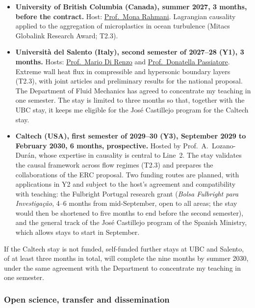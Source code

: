 \documentclass[11pt]{article}
\begin{document}
\begin{itemize}
  \item \textbf{University of British Columbia (Canada), summer 2027, 3 months, before the
  contract.} Host: \href{https://chbe.ubc.ca/mona-rahmani/}{Prof.\ Mona Rahmani}. Lagrangian
  causality applied to the aggregation of microplastics in ocean turbulence (Mitacs Globalink
  Research Award; T2.3).
  
  \item \textbf{Universit\`a del Salento (Italy), second semester of 2027--28 (Y1), 3 months.} Hosts:
  \href{https://www.unisalento.it/scheda-utente/-/people/mario.direnzo}{Prof.\ Mario Di Renzo}
  and \href{https://www.unisalento.it/scheda-utente/-/people/donatella.passiatore}{Prof.\
  Donatella Passiatore}. Extreme wall heat flux in compressible and hypersonic boundary layers (T2.3), with
  joint articles and preliminary results for the national proposal. The Department of Fluid
  Mechanics has agreed to concentrate my teaching in one semester. The stay is limited to
  three months so that, together with the UBC stay, it keeps me eligible for the José
  Castillejo program for the Caltech stay.
  
  \item \textbf{Caltech (USA), first semester of 2029--30 (Y3), September 2029 to February 2030, 6 months,
  prospective.} Hosted by Prof.\ A.\ Lozano-Dur\'an, whose expertise in causality is central to Line~2. The stay validates the causal framework across flow regimes (T2.3) and prepares the collaborations of the ERC proposal. Two funding routes are planned,
  with applications in Y2 and subject to the host's agreement and compatibility with
  teaching: the Fulbright Portugal research grant (\emph{Bolsa Fulbright para
  Investiga\c{c}\~ao}, 4--6 months from mid-September, open to all areas; the stay would then be
  shortened to five months to end before the second semester), and the general track of the José
  Castillejo program of the Spanish Ministry, which allows stays to start in September.
\end{itemize}
If the Caltech stay is not funded, self-funded further stays at UBC and Salento, of at least three
months in total, will complete the nine months by summer 2030, under the same agreement with the
Department to concentrate my teaching in one semester.

\subsubsection{Open science, transfer and dissemination}
\end{document}
